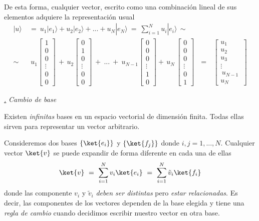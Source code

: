 \documentclass[a4paper,11pt]{book} %
\numberwithin{equation}{chapter}
\def\subsubiContadorIt{\par\addtocounter{subsubsection}{1}\underline{\it\thesubsubsection.}\hskip0.5cm \setcounter{subsubsubsectionIt}{0}}
\newcommand{\SubsubiIt}[1]{
		\subsubiContadorIt \textit{#1}
	}
\newcounter{subsubsubsectionIt}[subsubsection]
\begin{document}
De esta forma, cualquier vector, escrito como una combinación lineal de sus elementos adquiere la representación usual
	\begin{align}
	|u\rangle ~&=~ {u_1} |e_1 \rangle + {u_2} | e_2\rangle +... + {u_{ N}}|e_{ N}\rangle~=~ \sum_{i=1}^N {u_ i} |e_i\rangle \,\sim \\
	\sim &~ {u_1} \begin{bmatrix} 1 \\ 0 \\ 0\\ \vdots 
\\ 0 \\ 0 \end{bmatrix} \,+\,{u_2} \begin{bmatrix} 0 \\ 1 \\ 0\\ \vdots \\ 0 \\ 0 \end{bmatrix}~+~ ... ~+ ~
{u_{N-1}} \begin{bmatrix} 0 \\ 0 \\ 0\\\vdots 
\\ 1 \\ 0 \end{bmatrix}+ 
\,{u_N}\,  \begin{bmatrix} 0 \\ 0 \\0\\ \vdots 
\\ 0 \\ 1 \end{bmatrix}~~~= ~~~
  \begin{bmatrix} {u_1} \\ {u_2} \\{u_3}\\ \vdots 
\\ \,{u_{N-1}}\, \\ {u_{N}} \end{bmatrix}
	\end{align}

		
			\SubsubiIt{Cambio de base}

Existen \textit{infinitas} bases  en un espacio vectorial de dimensión finita.
Todas ellas sirven para representar un vector arbitrario.

Consideremos dos bases 
$\{\ket{e_i}\}$ y $\{\ket{f_j}\}$ donde $ i,j = 1,...,N$.
Cualquier vector $\ket{v}$ se puede expandir de forma diferente en cada una de ellas
$$
\ket{v} ~=~ \sum_{i=1}^N v_i \ket{e_i} ~=~ \sum_{i=1}^N \tilde v_i \ket{f_i}
$$
donde las componente $v_i$ y $\tilde v_i$ \textit{deben ser distintas} pero \textit{estar relacionadas}. Es decir, las componentes de los vectores dependen de la base elegida y tiene una \textit{regla de cambio} cuando decidimos escribir nuestro vector en otra base.
		
\end{document}

